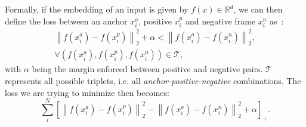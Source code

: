\documentclass[\home/main.tex]{subfiles}
\begin{document}
Formally, if the embedding of an input is given by $f(x) \in \mathbb{R}^d$, we can then define the loss between an anchor $x_i^a$, positive $x_i^p$ and negative frame $x_i^n$ as~\cite{FaceNet}:
\begin{align}
    \left\|f\left(x_{i}^{a}\right)-f\left(x_{i}^{p}\right)\right\|_{2}^{2}+\alpha<\left\|f\left(x_{i}^{a}\right)-f\left(x_{i}^{n}\right)\right\|_{2}^{2} \nonumber, \\
    \forall\left(f\left(x_{i}^{a}\right), f\left(x_{i}^{p}\right), f\left(x_{i}^{n}\right)\right) \in \mathcal{T},    \nonumber
\end{align}
with $\alpha$ being the margin enforced between positive and negative pairs. $\mathcal{T}$ represents all possible triplets, i.e. all \textit{anchor-positive-negative} combinations. The loss we are trying to minimize then becomes:
\begin{equation*}
    \sum_{i}^{N}\left[\left\|f\left(x_{i}^{a}\right)-f\left(x_{i}^{p}\right)\right\|_{2}^{2}-\left\|f\left(x_{i}^{a}\right)-f\left(x_{i}^{n}\right)\right\|_{2}^{2}+\alpha\right]_{+}.
\end{equation*}

\end{document}
